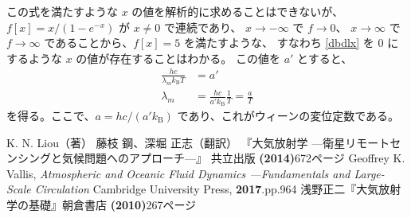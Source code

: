\documentclass[book]{dennou777}
\begin{document}
この式を満たすような \(x\) の値を解析的に求めることはできないが、
\(f[x]=x/(1-e^{-x})\) が \(x\neq0\) で連続であり、 \(x\to-\infty\) で \(f\to0\)、
\(x\to\infty\) で \(f\to\infty\) であることから、\(f[x]=5\) を満たすような、
すなわち \eqref{dbdlx} を \(0\) にするような \(x\) の値が存在することはわかる。
この値を \(a'\) とすると、
\begin{align}
	\frac{hc}{\lambda_m k_\mathrm{B}T}&=a'\\
	\lambda_m&=\frac{hc}{a'k_\mathrm{B}}\frac{1}{T}=\frac{a}{T}
\end{align}
を得る。ここで、\(a=hc/(a'k_\mathrm{B})\) であり、これがウィーンの変位定数である。

\clearpage
\begin{thebibliography}{9}
	 K. N. Liou（著） 藤枝 鋼、深堀 正志（翻訳）
	『大気放射学 ---衛星リモートセンシングと気候問題へのアプローチ---』
	共立出版 \textbf{(2014)}\quad672ページ
	 Geoffrey K. Vallis,
	\textit{Atmospheric and Oceanic Fluid Dynamics ---Fundamentals and Large-Scale Circulation}
	Cambridge University Press, \textbf{2017}.\quad pp.964
	 浅野正二『大気放射学の基礎』朝倉書店 \textbf{(2010)}\quad267ページ
\end{thebibliography}

\pagebreak
\listoffigures
\listoftables
\end{document}
